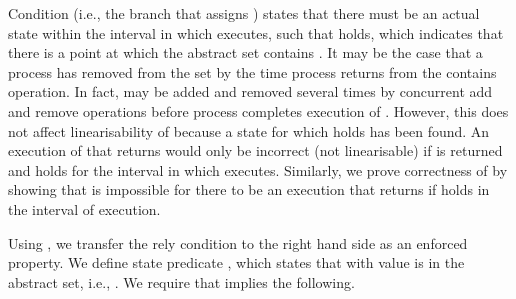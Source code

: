 \documentclass{article}
\theoremstyle{plain}
\newcounter{thm}
\theoremstyle{definition}
\begin{document}
Condition  (i.e., the branch that assigns ) states that there must be an actual state  within the
interval in which  executes, such that  holds, which indicates that there is a point at which
the abstract set contains . It may be the case that a process  has removed  from the set by the time process  returns
from the contains operation. In fact,  may be added and removed
several times by concurrent add and remove operations before process
 completes execution of . However, this
does not affect linearisability of  because a
state for which  holds has been found.  An execution of
 that returns  would only be incorrect
(not linearisable) if  is returned and  holds for the interval in which 
executes. Similarly, we prove correctness of  by showing
that is impossible for there to be an execution that returns 
if  holds in the interval of execution.
\smallskip

 Using ,
we transfer the rely condition  to the right hand side as an
enforced property. We define state predicate , which
states that  with value  is in the abstract set, i.e.,
.  We require
that  implies the following.
\end{document}
